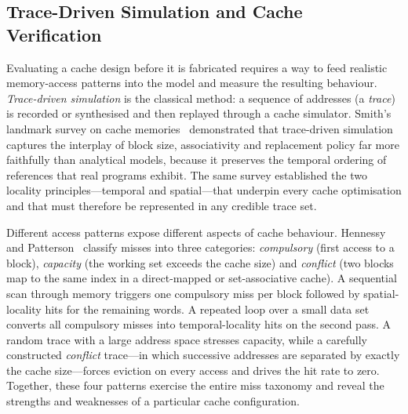 %


\subsection{Trace-Driven Simulation and Cache Verification}
\label{sec:m4-litrev}

Evaluating a cache design before it is fabricated requires a way to feed
realistic memory-access patterns into the model and measure the resulting
behaviour.  \emph{Trace-driven simulation} is the classical method: a
sequence of addresses (a \emph{trace}) is recorded or synthesised and then
replayed through a cache simulator.  Smith's landmark survey on cache
memories~\cite{smith1982cache} demonstrated that trace-driven simulation
captures the interplay of block size, associativity and replacement policy
far more faithfully than analytical models, because it preserves the
temporal ordering of references that real programs exhibit.  The same survey
established the two locality principles---temporal and spatial---that
underpin every cache optimisation and that must therefore be represented in
any credible trace set.

Different access patterns expose different aspects of cache behaviour.
Hennessy and Patterson~\cite{hennessy2017quantitative} classify misses into
three categories: \emph{compulsory} (first access to a block),
\emph{capacity} (the working set exceeds the cache size) and
\emph{conflict} (two blocks map to the same index in a direct-mapped or
set-associative cache).  A sequential scan through memory triggers one
compulsory miss per block followed by spatial-locality hits for the
remaining words.  A repeated loop over a small data set converts all
compulsory misses into temporal-locality hits on the second pass.  A random
trace with a large address space stresses capacity, while a carefully
constructed \emph{conflict} trace---in which successive addresses are
separated by exactly the cache size---forces eviction on every access and
drives the hit rate to zero.  Together, these four patterns exercise the
entire miss taxonomy and reveal the strengths and weaknesses of a
particular cache configuration.

